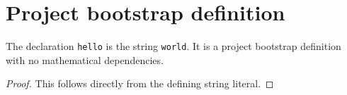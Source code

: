 
\chapter{Project bootstrap definition}
\label{ch:IPhO2026Run_Basic}

\begin{definition}
  \label{def:project:hello}
  The declaration \texttt{hello} is the string \texttt{world}.  It is a
  project bootstrap definition with no mathematical dependencies.
\end{definition}
\begin{proof}
  This follows directly from the defining string literal.
\end{proof}
